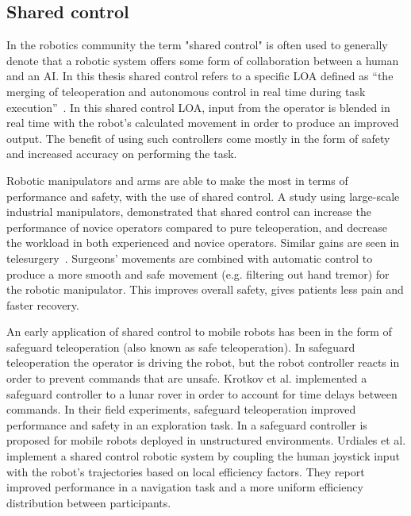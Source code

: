 \documentclass[a4paper,12pt,oneside,openright]{bhamthesis}
\begin{document}

\subsection{Shared control}
In the robotics community the term "shared control" is often used to generally denote that a robotic system offers some form of collaboration between a human and an AI. In this thesis shared control refers to a specific LOA defined as ``the merging of teleoperation and autonomous control in real time during task execution''~\citep{Backes1994}. In this shared control LOA, input from the operator is blended in real time with the robot's calculated movement in order to produce an improved output. The benefit of using such controllers come mostly in the form of safety and increased accuracy on performing the task. 

Robotic manipulators and arms are able to make the most in terms of performance and safety, with the use of shared control. A study using large-scale industrial manipulators, \citep{Hansson2010} demonstrated that shared control can increase the performance of novice operators compared to pure teleoperation, and decrease the workload in both experienced and novice operators. Similar gains are seen in telesurgery~\citep{Ballantyne2002}. Surgeons' movements are combined with automatic control to produce a more smooth and safe movement (e.g. filtering out hand tremor) for the robotic manipulator. This improves overall safety, gives patients less pain and faster recovery.

An early application of shared control to mobile robots has been in the form of safeguard teleoperation (also known as safe teleoperation). In safeguard teleoperation the operator is driving the robot, but the robot controller reacts in order to prevent commands that are unsafe. Krotkov et al. \citep{Krotkov1996} implemented a safeguard controller to a lunar rover in order to account for time delays between commands. In their field experiments, safeguard teleoperation improved performance and safety in an exploration task. In \citep{Fong2001a} a safeguard controller is proposed for mobile robots deployed in unstructured environments. Urdiales et al. \citep{Urdiales2007} implement a shared control robotic system by coupling the human joystick input with the robot's trajectories based on local efficiency factors. They report improved performance in a navigation task and a more uniform efficiency distribution between participants.
\end{document}
